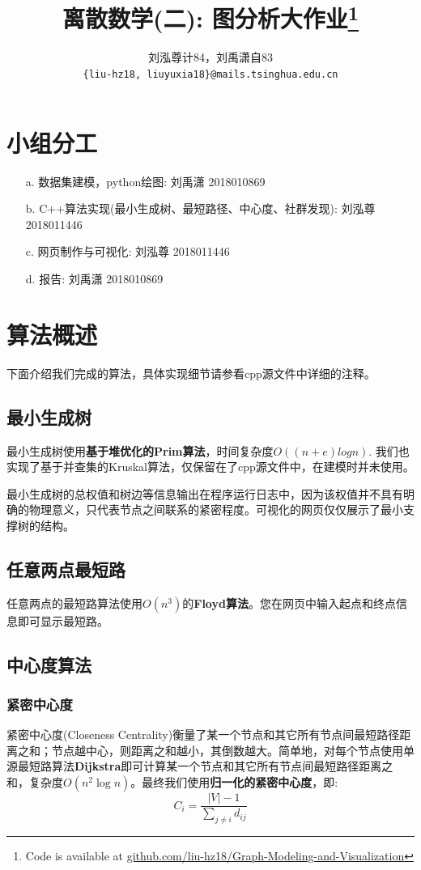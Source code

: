 \documentclass[UTF8, onecolumn, a4paper]{article}
\title{\textbf{离散数学(二): 图分析大作业\footnote{Code is available at \href{https://github.com/liu-hz18/Graph-Modeling-and-Visualization}{github.com/liu-hz18/Graph-Modeling-and-Visualization}}}}%
\author{刘泓尊\quad 2018011446\quad 计84，刘禹潇\quad 2018010869\quad 自83\\ \texttt{\{liu-hz18, liuyuxia18\}@mails.tsinghua.edu.cn}\quad  }
\begin{document}
\maketitle
\tableofcontents
\section{小组分工}
\begin{enumerate}
	\item[a.] 数据集建模，python绘图: 刘禹潇 2018010869
	\item[b.] C++算法实现(最小生成树、最短路径、中心度、社群发现): 刘泓尊 2018011446
	\item[c.] 网页制作与可视化: 刘泓尊 2018011446
	\item[d.] 报告: 刘禹潇 2018010869
\end{enumerate}



\section{算法概述}
下面介绍我们完成的算法，具体实现细节请参看cpp源文件中详细的注释。
\subsection{最小生成树}
最小生成树使用\textbf{基于堆优化的Prim算法}，时间复杂度$O((n+e)logn)$. 我们也实现了基于并查集的Kruskal算法，仅保留在了cpp源文件中，在建模时并未使用。

最小生成树的总权值和树边等信息输出在程序运行日志中，因为该权值并不具有明确的物理意义，只代表节点之间联系的紧密程度。可视化的网页仅仅展示了最小支撑树的结构。
\subsection{任意两点最短路}
任意两点的最短路算法使用$O(n^3)$的\textbf{Floyd算法}。您在网页中输入起点和终点信息即可显示最短路。
\subsection{中心度算法}
\subsubsection{紧密中心度}
紧密中心度(Closeness Centrality)衡量了某一个节点和其它所有节点间最短路径距离之和；节点越中心，则距离之和越小，其倒数越大。简单地，对每个节点使用单源最短路算法\textbf{Dijkstra}即可计算某一个节点和其它所有节点间最短路径距离之和，复杂度$O(n^2\log n)$。最终我们使用\textbf{归一化的紧密中心度}，即:
$$C_i = \frac{|V| - 1}{\sum_{j\neq i}d_{ij}}$$
\end{document}

